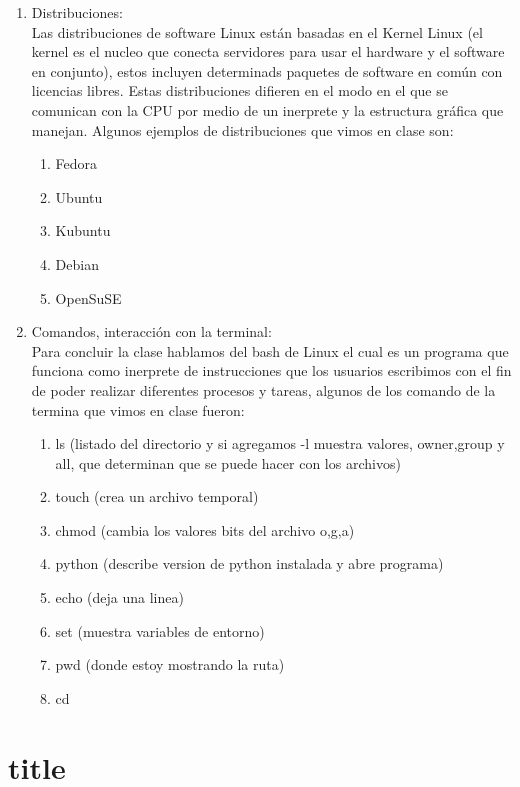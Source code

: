 \documentclass[letterpaper, 12pt, oneside]{article}
\begin{document}
\begin{enumerate}
		\item Distribuciones:\\
		Las distribuciones de software Linux est\'an basadas en el Kernel Linux (el kernel es el nucleo que conecta servidores para usar el hardware y el software en conjunto), estos incluyen determinads paquetes de software en com\'un con licencias libres. Estas distribuciones difieren en el modo en el que se comunican con la CPU por medio de un inerprete y la estructura gr\'afica que manejan. Algunos ejemplos de distribuciones que vimos en clase son:
		\begin{enumerate}
			\item Fedora
			\item Ubuntu
			\item Kubuntu
			\item Debian
			\item OpenSuSE
		\end{enumerate}
	
		\item Comandos, interacci\'on con la terminal:\\
		Para concluir la clase hablamos del bash de Linux el cual es un programa que funciona como inerprete de instrucciones que los usuarios escribimos con el fin de poder realizar diferentes procesos y tareas, algunos de los comando de la termina que vimos en clase fueron:
		\begin{enumerate}
			\item ls	(listado del directorio y si agregamos -l muestra valores, owner,group y all, que determinan que se puede hacer con los archivos)
			\item touch	(crea un archivo temporal)
			\item chmod	(cambia los valores bits del archivo o,g,a)
			\item python	(describe version de python instalada y abre programa)
			\item echo (deja una linea) 
			\item set	(muestra variables de entorno)
			\item pwd	(donde estoy mostrando la ruta)
			\item cd
		\end{enumerate}
	\end{enumerate}\part{title}
\end{document}
